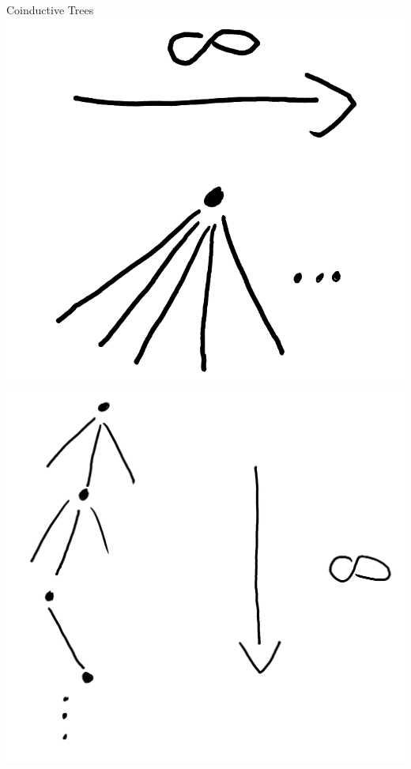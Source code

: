 \documentclass[t,12pt]{beamer}
\begin{document}
\begin{frame}[fragile]{Coinductive Trees}
{
    \hfill
    \includegraphics[scale=0.1]{tree_inf_wide.png}
    \hspace*{2.6cm}
    \includegraphics[scale=0.07]{tree_inf_deep.png}    
    \hfill
}



     
\end{frame}
    
\end{document}
